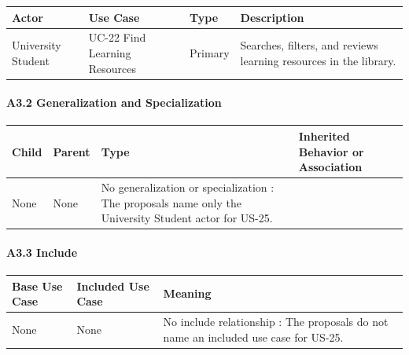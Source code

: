 \documentclass[12pt]{article}
\renewcommand{\baselinestretch}{1.5}
\begin{document}
\begingroup
\small
\renewcommand{\baselinestretch}{1.0}\selectfont
\renewcommand{\arraystretch}{1.15}
\setlength{\tabcolsep}{6pt}
\begin{longtable}{|>{\raggedright\arraybackslash}p{}|>{\raggedright\arraybackslash}p{}|>{\raggedright\arraybackslash}p{}|>{\raggedright\arraybackslash}p{}|}
\hline
\textbf{Actor} & \textbf{Use Case} & \textbf{Type} & \textbf{Description} \\ \hline
\endhead
University Student & UC-22 Find Learning Resources & Primary & Searches, filters, and reviews learning resources in the library. \\ \hline
\end{longtable}
\endgroup
\par\medskip

\hypertarget{sec:a3-2-generalization-and-specialization}{}
\paragraph*{A3.2 Generalization and Specialization}
\par\medskip

\begingroup
\small
\renewcommand{\baselinestretch}{1.0}\selectfont
\renewcommand{\arraystretch}{1.15}
\setlength{\tabcolsep}{6pt}
\begin{longtable}{|>{\raggedright\arraybackslash}p{}|>{\raggedright\arraybackslash}p{}|>{\raggedright\arraybackslash}p{}|>{\raggedright\arraybackslash}p{}|}
\hline
\textbf{Child} & \textbf{Parent} & \textbf{Type} & \textbf{Inherited Behavior or Association} \\ \hline
\endhead
None & None & No generalization or specialization : The proposals name only the University Student actor for US-25. \\ \hline
\end{longtable}
\endgroup
\par\medskip

\hypertarget{sec:a3-3-include}{}
\paragraph*{A3.3 Include}
\par\medskip

\begingroup
\small
\renewcommand{\baselinestretch}{1.0}\selectfont
\renewcommand{\arraystretch}{1.15}
\setlength{\tabcolsep}{6pt}
\begin{longtable}{|>{\raggedright\arraybackslash}p{}|>{\raggedright\arraybackslash}p{}|>{\raggedright\arraybackslash}p{}|}
\hline
\textbf{Base Use Case} & \textbf{Included Use Case} & \textbf{Meaning} \\ \hline
\endhead
None & None & No include relationship : The proposals do not name an included use case for US-25. \\ \hline
\end{longtable}
\endgroup
\par\medskip
\end{document}
